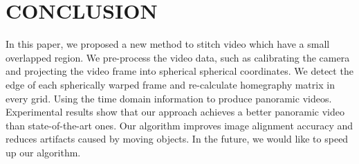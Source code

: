 \documentclass[conference]{IEEEtran}
\begin{document}
\section{CONCLUSION}
\label{sec:conclusion}

In this paper, we proposed a new method to stitch video which have a small overlapped region. We pre-process the video data, such as calibrating the camera and projecting the video frame into spherical
spherical coordinates. We detect the edge of each spherically warped frame and re-calculate homegraphy matrix in every grid. Using the time domain information to produce panoramic videos. 
Experimental results show that our approach achieves a better panoramic video than state-of-the-art ones. Our algorithm improves image alignment accuracy and reduces artifacts caused by
moving objects. In the future, we would like to speed up our algorithm.
\end{document}
